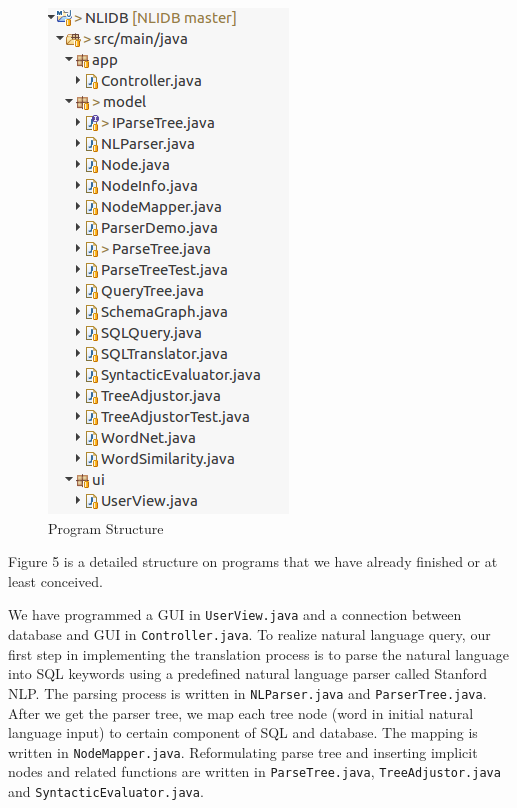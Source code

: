 \documentclass[twocolumn]{article}
\begin{document}
\begin{figure}[ht]
  \centering
  \includegraphics[width=0.8\linewidth]{figures/program_structure.png}
  \caption{Program Structure}
\end{figure}
  
Figure 5 is a detailed structure on programs that we have already finished or at least conceived.

We have programmed a GUI in \texttt{UserView.java} and a connection between database and GUI in \texttt{Controller.java}. To realize natural language query, our first step in implementing the translation process is to parse the natural language into SQL keywords using a predefined natural language parser called Stanford NLP. The parsing process is written in \texttt{NLParser.java} and \texttt{ParserTree.java}. After we get the parser tree, we map each tree node (word in initial natural language input) to certain component of SQL and database. The mapping is written in \texttt{NodeMapper.java}. Reformulating parse tree and inserting implicit nodes and related functions are written in \texttt{ParseTree.java}, \texttt{TreeAdjustor.java} and \texttt{SyntacticEvaluator.java}.
\end{document}
